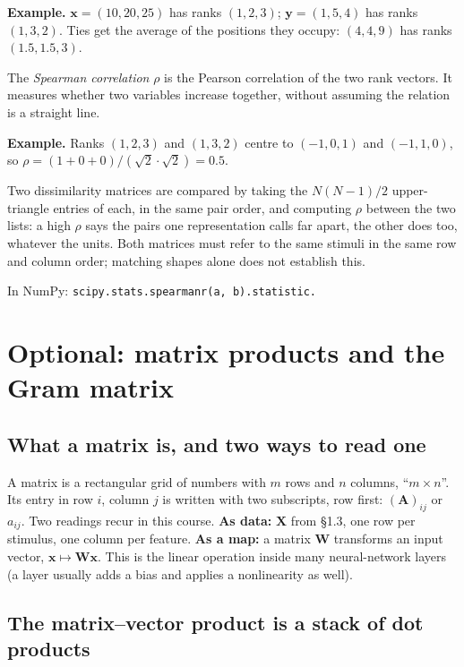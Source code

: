 \documentclass[11pt]{article}
\newcommand{\vx}{\bm{x}}
\newcommand{\vy}{\bm{y}}
\newcommand{\mX}{\bm{X}}
\newcommand{\np}[1]{{\small\color{lightgray}In NumPy: \texttt{#1}}\par}
\begin{document}
\textbf{Example.} $\vx = (10, 20, 25)$ has ranks $(1, 2, 3)$; $\vy = (1, 5, 4)$ has ranks
$(1, 3, 2)$. Ties get the average of the positions they occupy: $(4, 4, 9)$ has ranks
$(1.5, 1.5, 3)$.

The \emph{Spearman correlation} $\rho$ is the Pearson correlation of the two rank vectors.
It measures whether two variables increase together, without assuming the relation is a
straight line.

\textbf{Example.} Ranks $(1, 2, 3)$ and $(1, 3, 2)$ centre to $(-1, 0, 1)$ and
$(-1, 1, 0)$, so $\rho = (1 + 0 + 0)/(\sqrt{2}\cdot\sqrt{2}) = 0.5$.

Two dissimilarity matrices are compared by taking the $N(N-1)/2$ upper-triangle entries of
each, in the same pair order, and computing $\rho$ between the two lists: a high $\rho$
says the pairs one representation calls far apart, the other does too, whatever the units.
Both matrices must refer to the same stimuli in the same row and column order; matching
shapes alone does not establish this.

\np{scipy.stats.spearmanr(a, b).statistic.}

\section{Optional: matrix products and the Gram matrix}
\label{sec:matrices}

\subsection{What a matrix is, and two ways to read one}

A matrix is a rectangular grid of numbers with $m$ rows and $n$ columns, ``$m \times n$''.
Its entry in row $i$, column $j$ is written with two subscripts, row first: $(\bm{A})_{ij}$
or $a_{ij}$. Two readings recur in this course.
\textbf{As data:} $\mX$ from \S1.3, one row per stimulus, one column per feature.
\textbf{As a map:} a matrix $\bm{W}$ transforms an input vector, $\vx \mapsto \bm{W}\vx$.
This is the linear operation inside many neural-network layers (a layer usually adds a bias
and applies a nonlinearity as well).

\subsection{The matrix--vector product is a stack of dot products}
\end{document}
